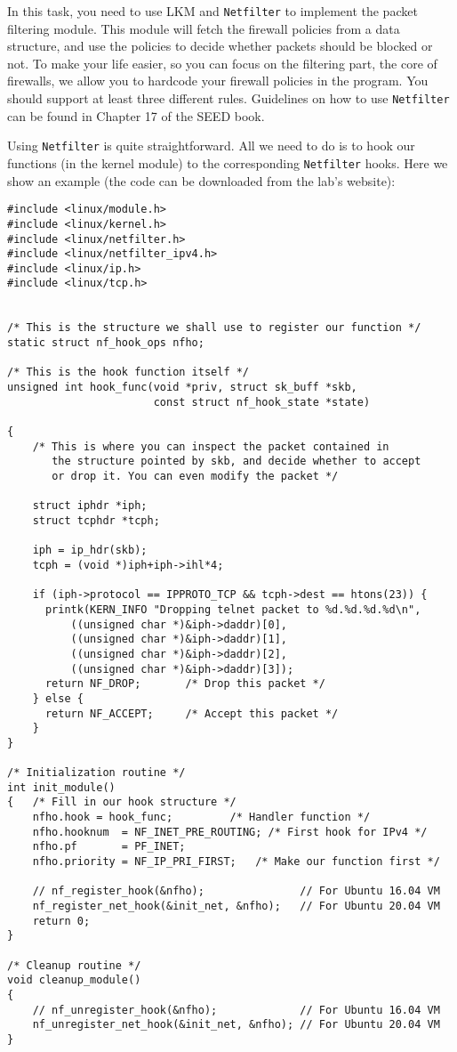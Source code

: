 In this task, you need to use LKM and {\tt Netfilter} to implement
the packet filtering module.  This module will fetch 
the firewall policies from a data structure, and use the 
policies to decide whether packets should be blocked or not.
To make your life easier, so you can focus on the filtering part, 
the core of firewalls, we allow you to hardcode your firewall policies 
in the program. You should support at least three different 
rules. Guidelines on how to use \texttt{Netfilter} can be 
found in Chapter 17 of the SEED book.


Using {\tt Netfilter} is quite straightforward. All we need to do
is to hook our functions (in the kernel module) to the corresponding
{\tt Netfilter} hooks. Here we show an example (the code can
be downloaded from the lab's website):


\begin{lstlisting}
#include <linux/module.h>
#include <linux/kernel.h>
#include <linux/netfilter.h>
#include <linux/netfilter_ipv4.h>
#include <linux/ip.h>
#include <linux/tcp.h>


/* This is the structure we shall use to register our function */
static struct nf_hook_ops nfho;

/* This is the hook function itself */
unsigned int hook_func(void *priv, struct sk_buff *skb, 
                       const struct nf_hook_state *state)

{
    /* This is where you can inspect the packet contained in
       the structure pointed by skb, and decide whether to accept 
       or drop it. You can even modify the packet */
 
    struct iphdr *iph;
    struct tcphdr *tcph;
    
    iph = ip_hdr(skb);
    tcph = (void *)iph+iph->ihl*4;
 
    if (iph->protocol == IPPROTO_TCP && tcph->dest == htons(23)) {
      printk(KERN_INFO "Dropping telnet packet to %d.%d.%d.%d\n",
          ((unsigned char *)&iph->daddr)[0],
          ((unsigned char *)&iph->daddr)[1],
          ((unsigned char *)&iph->daddr)[2],
          ((unsigned char *)&iph->daddr)[3]);
      return NF_DROP;       /* Drop this packet */
    } else {
      return NF_ACCEPT;     /* Accept this packet */
    }
}

/* Initialization routine */
int init_module()
{   /* Fill in our hook structure */
    nfho.hook = hook_func;         /* Handler function */
    nfho.hooknum  = NF_INET_PRE_ROUTING; /* First hook for IPv4 */
    nfho.pf       = PF_INET;
    nfho.priority = NF_IP_PRI_FIRST;   /* Make our function first */

    // nf_register_hook(&nfho);               // For Ubuntu 16.04 VM
    nf_register_net_hook(&init_net, &nfho);   // For Ubuntu 20.04 VM
    return 0;
}

/* Cleanup routine */
void cleanup_module()
{
    // nf_unregister_hook(&nfho);             // For Ubuntu 16.04 VM
    nf_unregister_net_hook(&init_net, &nfho); // For Ubuntu 20.04 VM
}
\end{lstlisting}


